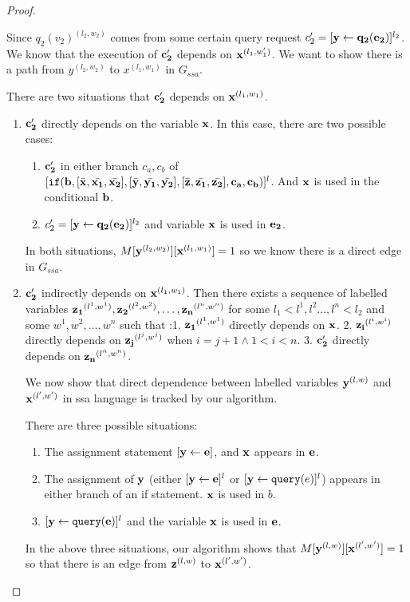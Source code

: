 \documentclass[a4paper,11pt]{article}
\begin{document}
\begin{proof}
\begin{itemize}
\begin{enumerate}
\begin{enumerate}
 Since $q_2(v_2)^{(l_2,w_2)}$  comes from some certain query request $c_2' =[\mathrel{ \mathbf{{y}} \leftarrow \mathbf{{q_2(e_2)}} }]^{l_2}$. We know that the execution of $\mathbf{{c_2'}}$ depends on $\mathbf{{x}}^{(l_1,w_1')}$. We want to show there is a path from $ y^{(l_2,w_2)}$ to $x^{(l_1,w_1)}$ in $G_{ssa}$. 
 
 There are two situations that $\mathbf{{c_2'}}$ depends on $\mathbf{{x}}^{(l_1,w_1)}$.
 \begin{enumerate}
     \item $\mathbf{{c_2'}}$ directly depends on the variable $\mathbf{{x}}$. In this case, there are two possible cases: 
     \begin{enumerate}
         \item $\mathbf{{c_2'}}$ in either branch $c_a,c_b$ of $ [\mathtt{if}(\mathbf{{b}},[ \bar{\mathbf{{x}}}, \bar{\mathbf{{x_1}}}, \bar{\mathbf{{x_2}}}] ,[ \bar{\mathbf{{y}}}, \bar{\mathbf{{y_1}}}, \bar{\mathbf{{y_2}}}] , [ \bar{\mathbf{{z}}}, \bar{\mathbf{{z_1}}}, \bar{\mathbf{{z_2}}}] , \mathbf{{ c_a, c_b)}}]^{l} $. And  $\mathbf{{x}}$ is used in the conditional $\mathbf{{b}}$. 
         \item $c_2' =[\mathrel{ \mathbf{{y}} \leftarrow \mathbf{{q_2(e_2)}} }]^{l_2}$ and variable $\mathbf{{x}}$ is used in $\mathbf{{e_2}}$.
     \end{enumerate}
     In both situations,  $M[\mathbf{{y}}^{(l_2,w_2)}][\mathbf{{x}}^{(l_1,w_1)}] = 1$ so we know  there is a direct edge in $G_{ssa}$.
    \item $\mathbf{{c_2'}}$ indirectly depends on $\mathbf{{x}}^{(l_1,w_1)}$. Then there exists a sequence of labelled variables $\mathbf{{z_1}}^{(l^1,w^1)},\mathbf{{z_2}}^{(l^2,w^2)}, \ldots, \mathbf{{z_n}}^{(l^n,w^n)} $ for some $l_1<l^1 , l^2 \ldots, l^n < l_2$ and some $w^1, w^2, \ldots, w^n$ such that :1. $\mathbf{{z_1}}^{(l^1,w^1)}$ directly depends on $\mathbf{{x}}$. 2. $\mathbf{{z_i}}^{(l^i,w^i)}$ directly depends on $\mathbf{{z_j}}^{(l^j,w^j)}$ when $i = j+1 \land 1 <i < n $. 3. $\mathbf{{c_2'}}$ directly depends on $\mathbf{{z_n}}^{(l^n,w^n)}$. 
    
    We now show that direct dependence between labelled variables $\mathbf{{y}}^{(l,w)}$ and $\mathbf{{x}}^{(l',w')}$ in ssa language is tracked by our algorithm.
    
     There are three possible situations:
        \begin{enumerate}
            \item The assignment statement $ [\mathrel{ \mathbf{{y}} \leftarrow \mathbf{{e}} }] $, and $\mathbf{{x}}$ appears in $\mathbf{{e}}$.
            \item The assignment of $\mathbf{{y}}$ (either $[\mathrel{ \mathbf{{y}} \leftarrow \mathbf{{e}} }]^{l}$ or $[\mathrel{ \mathbf{{y}} \leftarrow {\tt query}(e) }]^{l}$) appears in either branch of an if statement. $\mathbf{{x}}$ is used in $b$.
            \item $ [\mathrel{ \mathbf{{y}} \leftarrow \mathbf{{{\tt query}(e)}} }]^{l}$ and the variable $\mathbf{{x}}$ is used in $\mathbf{{e}}$.  
        \end{enumerate}
        In the above three situations, our algorithm shows that $M[\mathbf{{y}}^{(l,w)}][\mathbf{{x}}^{(l',w')}] =1$ so that there is an edge from $\mathbf{{z}}^{(l,w)}$ to $\mathbf{{x}}^{(l', w')}$.  
        

\end{enumerate}
\end{enumerate}
\end{enumerate}
\end{itemize}
\end{proof}
\end{document}
